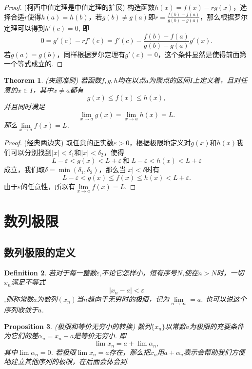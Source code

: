 \documentclass{article}
\newtheorem{theorem}{Theorem}[section]
\newtheorem{proposition}[theorem]{Proposition}
\newtheorem{definition}[theorem]{Definition}
\begin{document}
\begin{proof}
{\color{blue} (柯西中值定理是中值定理的扩展)} 构造函数$h(x) = f(x) - rg(x)$，选择合适$r$使得$h(a) = h(b)$，若$g(b) \neq g(a)$即$r = \frac{f(b)-f(a)}{g(b) - g(a)}$，那么根据{\color{red}罗尔定理}可以得到$h'(c) = 0$, 即
$$
0 = g'(c) - rf'(c) = f'(c) -  \frac{f(b)-f(a)}{g(b) - g(a)}g'(x).
$$
若$g(a) = g(b)$，同样根据{\color{red}罗尔定理}有$g'(c) = 0$，这个条件显然是使得前面第一个等式成立的.
\end{proof}


\begin{theorem}
\rm {\color{red} (夹逼准则)} 若函数$f,g,h$均在以点$a$为聚点的区间$I$上定义着，且对任意的$x \in I$，其中$x \neq a$都有
$$
g(x) \leq f(x) \leq h(x),
$$
并且同时满足
$$
\lim\limits_{x \rightarrow a}g(x) = \lim\limits_{x \rightarrow a}h(x) = L.
$$
那么$\lim\limits_{x \rightarrow a}f(x) = L$.
\end{theorem}

\begin{proof}
{\color{blue} (经典两边夹)} 取任意的正实数$\varepsilon > 0$，根据极限地定义对$g(x)$和$h(x)$我们可以分别找到$|x| < \delta_1$和$|x| < \delta_2$，使得
$$
L-\varepsilon < g(x) < L + \varepsilon~\text{和}~L-\varepsilon < h(x) < L + \varepsilon
$$
成立，我们取$\delta = \min(\delta_1, \delta_2)$，那么当$|x| < \delta$时有
$$
L-\varepsilon < g(x) \leq f(x) \leq h(x) < L+\varepsilon.
$$
由于$\varepsilon$的任意性，所以有$\lim\limits_{x \rightarrow a} f(x) = L$.
\end{proof}

\newpage
\section{数列极限}

\subsection{数列极限的定义}

\begin{definition}
\rm 若对于每一整数$\varepsilon$,不论它怎样小，恒有序号$N$,使在$n > N$时，一切$x_n$满足不等式\[|x_n-a| < \varepsilon\],则称常数$a$为数列$(x_n)$当$n$趋向于无穷时的{\color{red}极限}，记为$\lim\limits_{n \rightarrow \infty}=a$. 也可以说这个序列收敛于$a$. 
\end{definition}

\begin{proposition}
\rm {\color{red} (极限和等价无穷小的转换) } 数列$\{x_n\}$以常数$a$为极限的充要条件为它们的差$\alpha_n = x_n-a$是等价无穷小. 即
$$
\lim {x_n} = a + \lim \alpha_n,
$$
其中$\lim\alpha_n = 0$.
{\color{blue}若极限$\lim x_n = a$存在，那么把$x_n$用$a+\alpha_n$表示会帮助我们方便地建立其他序列的极限}，在后面会体会到. 
\end{proposition}
\end{document}
